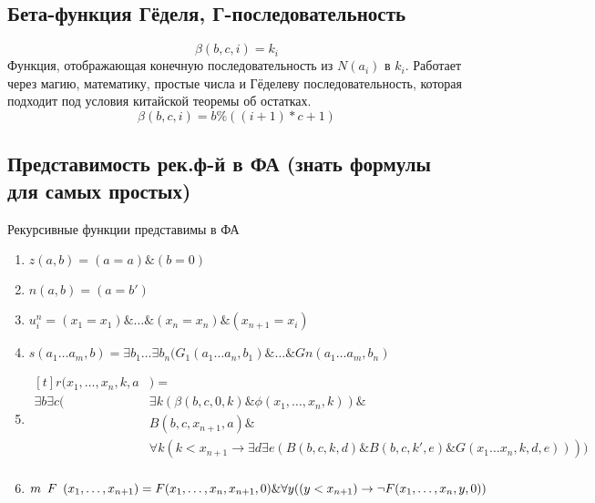 \subsection{Бета-функция Гёделя, Г-последовательность}
\label{sec-2-27}
\[\beta(b, c, i) = k_i\]
Функция, отображающая конечную последовательность из $N (a_i)$ в $k_i$.
Работает через магию, математику, простые числа и Гёделеву
последовательность, которая подходит под условия китайской
теоремы об остатках.
\[\beta(b, c, i) = b \% ((i + 1) * c + 1)\]
\subsection{Представимость рек.ф-й в ФА (знать формулы для самых простых)}
\label{sec-2-28}
Рекурсивные функции представимы в ФА
\begin{enumerate}
\item $z(a, b) = (a = a) \& (b = 0)$
\item $n(a, b) = (a = b')$
\item $u^n_i = (x_1 = x_1) \& \ldots{} \& (x_n = x_n) \& (x_{n+1} = x_i)$
\item $s(a_1\ldots{}a_m, b) = \exists b_1\ldots{}\exists b_n(G_1(a_1\ldots{}a_n, b_1) \& \ldots{} \& Gn(a_1\ldots{}a_m, b_n)$
\item $\begin{aligned}[t]
        r(x_1,\dotsc,x_n, k, a&) =\\
    \exists b\exists c(&\exists k(\beta(b, c, 0, k) \& \phi(x_1, \dotsc, x_n, k)) \&\\
        &B(b, c, x_{n+1}, a)\&\\
        &\forall k(k<x_{n+1} \to \exists d\exists e(B(b,c,k,d)\&B(b,c,k',e)\&G(x_1\ldots{}x_n,k,d,e))))\\
    \end{aligned}$
\item $m\ltemplate F\rtemplate(x_1,\dotsc, x_{n+1}) = F(x_1, \dotsc, x_n, x_{n+1}, 0) \& \forall y((y < x_{n+1}) \to \lnot F(x_1,\dotsc, x_n, y, 0))$
\end{enumerate}
